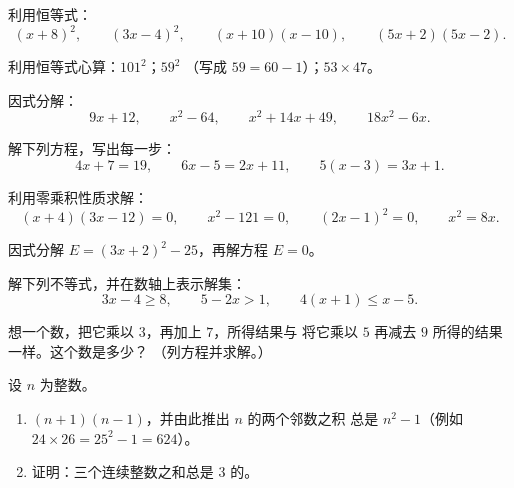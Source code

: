\begin{exercise}[$\star$]\label{exo:g9:algebra:2}
利用恒等式：
\[
(x + 8)^2, \qquad
(3x - 4)^2, \qquad
(x + 10)(x - 10), \qquad
(5x + 2)(5x - 2).
\]
\end{exercise}

\begin{exercise}[$\star$]\label{exo:g9:algebra:3}
利用恒等式心算：$101^2$；\quad $59^2$
（写成 $59 = 60 - 1$）；\quad $53 \times 47$。
\end{exercise}

\begin{exercise}[$\star$]\label{exo:g9:algebra:4}
因式分解：
\[
9x + 12, \qquad
x^2 - 64, \qquad
x^2 + 14x + 49, \qquad
18x^2 - 6x .
\]
\end{exercise}

\begin{exercise}[$\star$]\label{exo:g9:algebra:5}
解下列方程，写出每一步：
\[
4x + 7 = 19, \qquad
6x - 5 = 2x + 11, \qquad
5(x - 3) = 3x + 1 .
\]
\end{exercise}

\begin{exercise}[$\star\star$]\label{exo:g9:algebra:6}
利用零乘积性质求解：
\[
(x + 4)(3x - 12) = 0, \qquad
x^2 - 121 = 0, \qquad
(2x - 1)^2 = 0, \qquad
x^2 = 8x .
\]
\end{exercise}

\begin{exercise}[$\star\star$]\label{exo:g9:algebra:7}
因式分解 $E = (3x + 2)^2 - 25$，再解方程 $E = 0$。
\end{exercise}

\begin{exercise}[$\star\star$]\label{exo:g9:algebra:8}
解下列不等式，并在数轴上表示解集：
\[
3x - 4 \geq 8, \qquad
5 - 2x > 1, \qquad
4(x + 1) \leq x - 5 .
\]
\end{exercise}

\begin{exercise}[$\star\star$]\label{exo:g9:algebra:9}
想一个数，把它乘以 $3$，再加上 $7$，所得结果与
将它乘以 $5$ 再减去 $9$ 所得的结果一样。这个数是多少？
（列方程并求解。）
\end{exercise}

\begin{exercise}[$\star\star\star$]\label{exo:g9:algebra:10}
设 $n$ 为整数。
\begin{enumerate}
  \item {} $(n + 1)(n - 1)$，并由此推出 $n$ 的两个邻数之积
        总是 $n^2 - 1$（例如 $24 \times 26 =
        25^2 - 1 = 624$）。
  \item 证明：三个连续整数之和总是
        $3$ 的。
\end{enumerate}
\end{exercise}

